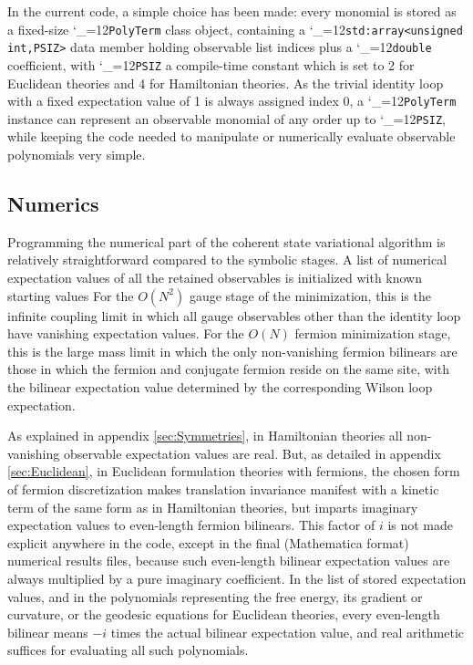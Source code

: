 \documentclass [12pt]{article}
\makeatletter
\renewcommand{\tt}{\begingroup\catcode`_=12\def\_{\string_}\tt@}
\newcommand{\tt@}[1]{\texttt{#1}\endgroup}
\makeatother
\begin{document}
In the current code, a simple choice has been made: every 
monomial is stored as a fixed-size \tt{PolyTerm} class object,
containing a
\tt{std:array<unsigned int,PSIZ>} data member holding observable
list indices plus a
\tt{double} coefficient,
with \tt{PSIZ} a compile-time constant which is
set to 2 for Euclidean theories and 4 for Hamiltonian theories.
As the trivial identity loop with a fixed expectation value of 1
is always assigned index 0, a \tt{PolyTerm} instance can
represent an observable monomial of any order up to \tt{PSIZ},
while keeping the code needed to manipulate or numerically evaluate 
observable polynomials very simple.

\subsection {Numerics}

Programming the numerical part of the coherent state variational
algorithm is relatively straightforward compared to the symbolic stages.
A list of numerical expectation values of all the retained
observables is initialized with known starting values
For the $O(N^2)$ gauge stage of the minimization,
this is the infinite coupling limit in which
all gauge observables other than the identity loop have
vanishing expectation values.
For the $O(N)$ fermion minimization stage,
this is the large mass limit in which
the only non-vanishing fermion bilinears are those
in which the fermion and conjugate fermion reside on
the same site, with the bilinear expectation value
determined by the corresponding Wilson loop expectation.

As explained in appendix \ref{sec:Symmetries},
in Hamiltonian theories
all non-vanishing observable expectation values are real.
But, as detailed in appendix \ref{sec:Euclidean}, in Euclidean formulation
theories with fermions, the chosen form of fermion discretization makes
translation invariance manifest with a kinetic term of the same
form as in Hamiltonian theories, but imparts imaginary expectation
values to even-length fermion bilinears.
This factor of $i$ is not made explicit anywhere in the code,
except in the final (Mathematica format) numerical results files,
because such even-length bilinear expectation values are always
multiplied by a pure imaginary coefficient.
In the list of stored expectation values,
and in
the polynomials representing the free energy, its gradient
or curvature, or the geodesic equations for Euclidean theories,
every even-length bilinear means $-i$ times the actual bilinear
expectation value, and
real arithmetic suffices for evaluating all such polynomials.
\end{document}
